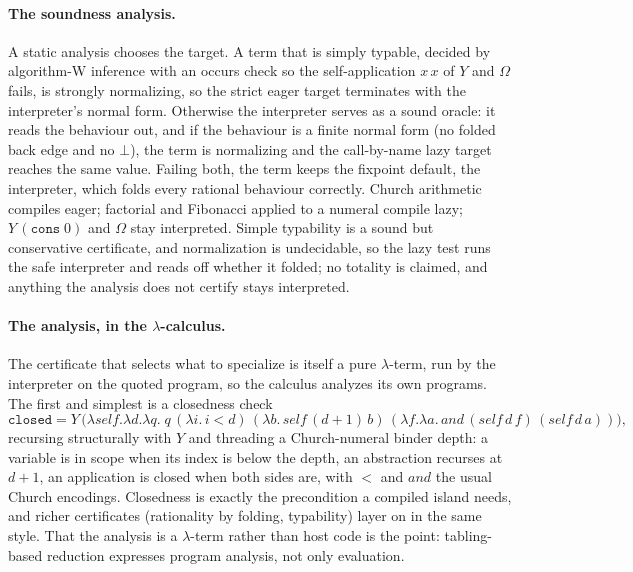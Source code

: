 \paragraph{The soundness analysis.}
A static analysis chooses the target. A term that is simply typable, decided by algorithm-W
inference with an occurs check so the self-application $x\,x$ of $Y$ and $\Omega$ fails, is
strongly normalizing, so the strict eager target terminates with the interpreter's normal form.
Otherwise the interpreter serves as a sound oracle: it reads the behaviour out, and if the behaviour
is a finite normal form (no folded back edge and no $\bot$), the term is normalizing and the
call-by-name lazy target reaches the same value. Failing both, the term keeps the fixpoint default,
the interpreter, which folds every rational behaviour correctly. Church arithmetic compiles eager;
factorial and Fibonacci applied to a numeral compile lazy; $Y\,(\mathtt{cons}\;0)$ and $\Omega$ stay
interpreted. Simple typability is a sound but conservative certificate, and normalization is
undecidable, so the lazy test runs the safe interpreter and reads off whether it folded; no totality
is claimed, and anything the analysis does not certify stays interpreted.

\paragraph{The analysis, in the $\lambda$-calculus.}
The certificate that selects what to specialize is itself a pure $\lambda$-term, run by the
interpreter on the quoted program, so the calculus analyzes its own programs. The first and simplest
is a closedness check
\[
  \mathtt{closed} = Y\,\big(\lambda\mathit{self}.\lambda d.\lambda q.\;
    q\,(\lambda i.\, i < d)\,
    (\lambda b.\,\mathit{self}\,(d{+}1)\,b)\,
  (\lambda f.\lambda a.\,\mathit{and}\,(\mathit{self}\,d\,f)\,(\mathit{self}\,d\,a))\big),
\]
recursing structurally with $Y$ and threading a Church-numeral binder depth: a variable is in scope
when its index is below the depth, an abstraction recurses at $d+1$, an application is closed when
both sides are, with $<$ and $\mathit{and}$ the usual Church encodings. Closedness is exactly the
precondition a compiled island needs, and richer certificates (rationality by folding, typability)
layer on in the same style. That the analysis is a $\lambda$-term rather than host code is the point:
tabling-based reduction expresses program analysis, not only evaluation.

